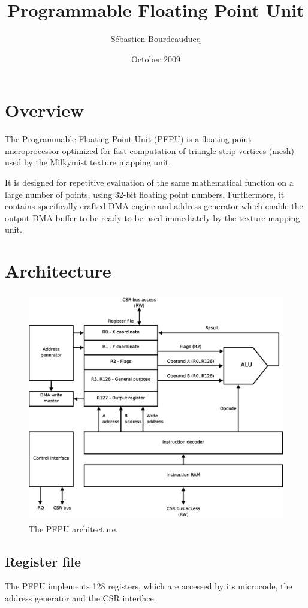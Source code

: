 \documentclass[a4paper,11pt]{article}
\title{Programmable Floating Point Unit}
\author{S\'ebastien Bourdeauducq}
\date{October 2009}
\begin{document}
\setlength{\parindent}{0pt}
\setlength{\parskip}{5pt}
\maketitle{}
\section{Overview}
The Programmable Floating Point Unit (PFPU) is a floating point microprocessor optimized for fast computation of triangle strip vertices (mesh) used by the Milkymist texture mapping unit.

It is designed for repetitive evaluation of the same mathematical function on a large number of points, using 32-bit floating point numbers. Furthermore, it contains specifically crafted DMA engine and address generator which enable the output DMA buffer to be ready to be used immediately by the texture mapping unit.

\section{Architecture}

\begin{figure}[H]
\centering
\includegraphics[height=100mm]{architecture.eps}
\caption{The PFPU architecture.}\label{fig:architecture}
\end{figure}

\subsection{Register file}
The PFPU implements 128 registers, which are accessed by its microcode, the address generator and the CSR interface.\\
\end{document}
